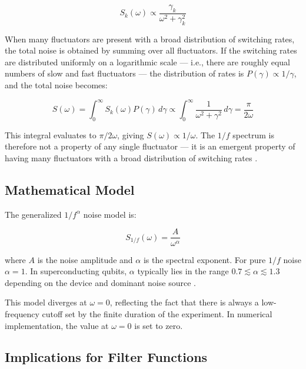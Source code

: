 \documentclass[10pt]{article}
\begin{document}
\begin{equation}
    S_k(\omega) \propto \frac{\gamma_k}{\omega^2 + \gamma_k^2}
\end{equation}

When many fluctuators are present with a broad distribution of switching rates, the total noise is obtained by summing over all fluctuators. If the switching rates are distributed uniformly on a logarithmic scale — i.e., there are roughly equal numbers of slow and fast fluctuators — the distribution of rates is $P(\gamma) \propto 1/\gamma$, and the total noise becomes:

\begin{equation}
    S(\omega) = \int_0^\infty S_k(\omega) P(\gamma)\, d\gamma \propto \int_0^\infty \frac{1}{\omega^2 + \gamma^2}\, d\gamma = \frac{\pi}{2\omega}
\end{equation}

This integral evaluates to $\pi/2\omega$, giving $S(\omega) \propto 1/\omega$. The $1/f$ spectrum is therefore not a property of any single fluctuator — it is an emergent property of having many fluctuators with a broad distribution of switching rates \cite{Paladino2014}.

\subsection{Mathematical Model}

The generalized $1/f^\alpha$ noise model is:

\begin{equation}
    \boxed{S_{1/f}(\omega) = \frac{A}{\omega^\alpha}}
\end{equation}

where $A$ is the noise amplitude and $\alpha$ is the spectral exponent. For pure $1/f$ noise $\alpha = 1$. In superconducting qubits, $\alpha$ typically lies in the range $0.7 \lesssim \alpha \lesssim 1.3$ depending on the device and dominant noise source \cite{Yoshihara2006, Bylander2011}.

This model diverges at $\omega = 0$, reflecting the fact that there is always a low-frequency cutoff set by the finite duration of the experiment. In numerical implementation, the value at $\omega = 0$ is set to zero.

\subsection{Implications for Filter Functions}
\end{document}
